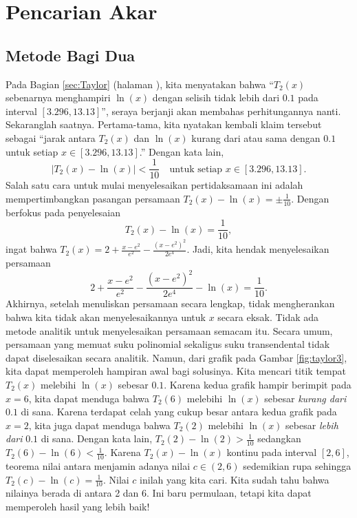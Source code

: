 
\chapter{Pencarian Akar}

\section{Metode Bagi Dua\label{sec:Bisection}}

Pada Bagian \ref{sec:Taylor} (halaman \pageref{equationToSolve}),
kita menyatakan bahwa ``$T_{2}(x)$ sebenarnya menghampiri $\ln(x)$
dengan selisih tidak lebih dari $0.1$ pada interval $[3.296,13.13]$'',
seraya berjanji akan membahas perhitungannya nanti. Sekaranglah saatnya.
Pertama-tama, kita nyatakan kembali klaim tersebut sebagai ``jarak
antara $T_{2}(x)$ dan $\ln(x)$ kurang dari atau sama dengan $0.1$
untuk setiap $x\in[3.296,13.13]$.'' Dengan kata lain, 
\[
|T_{2}(x)-\ln(x)|<\frac{1}{10}\quad\mbox{untuk setiap }x\in[3.296,13.13].
\]
Salah satu cara untuk mulai menyelesaikan pertidaksamaan ini adalah
mempertimbangkan pasangan persamaan $T_{2}(x)-\ln(x)=\pm\frac{1}{10}$.
Dengan berfokus pada penyelesaian 
\begin{equation}
T_{2}(x)-\ln(x)=\frac{1}{10},\label{eq:bisectionExample}
\end{equation}
ingat bahwa $T_{2}(x)=2+\frac{x-e^{2}}{e^{2}}-\frac{(x-e^{2})^{2}}{2e^{4}}$.
Jadi, kita hendak menyelesaikan persamaan
\[
2+\frac{x-e^{2}}{e^{2}}-\frac{(x-e^{2})^{2}}{2e^{4}}-\ln(x)=\frac{1}{10}.
\]
Akhirnya, setelah menuliskan persamaan secara lengkap, tidak mengherankan
bahwa kita tidak akan menyelesaikannya untuk $x$ secara eksak. Tidak
ada metode analitik untuk menyelesaikan persamaan semacam itu. Secara
umum, persamaan yang memuat suku polinomial sekaligus suku transendental
tidak dapat diselesaikan secara analitik. Namun, dari grafik pada
Gambar \ref{fig:taylor3}, kita dapat memperoleh hampiran awal bagi
solusinya. Kita mencari titik tempat $T_{2}(x)$ melebihi $\ln(x)$
sebesar $0.1$. Karena kedua grafik hampir berimpit pada $x=6$, kita
dapat menduga bahwa $T_{2}(6)$ melebihi $\ln(x)$ sebesar \textit{kurang
dari} $0.1$ di sana. Karena terdapat celah yang cukup besar antara
kedua grafik pada $x=2$, kita juga dapat menduga bahwa $T_{2}(2)$
melebihi $\ln(x)$ sebesar \textit{lebih dari} $0.1$ di sana. Dengan
kata lain, $T_{2}(2)-\ln(2)>\frac{1}{10}$ sedangkan $T_{2}(6)-\ln(6)<\frac{1}{10}$.
Karena $T_{2}(x)-\ln(x)$ kontinu pada interval $[2,6]$, teorema
nilai antara menjamin adanya nilai $c\in(2,6)$ sedemikian rupa sehingga
$T_{2}(c)-\ln(c)=\frac{1}{10}$. Nilai $c$ inilah yang kita cari.
Kita sudah tahu bahwa nilainya berada di antara 2 dan 6. Ini baru
permulaan, tetapi kita dapat memperoleh hasil yang lebih baik!

